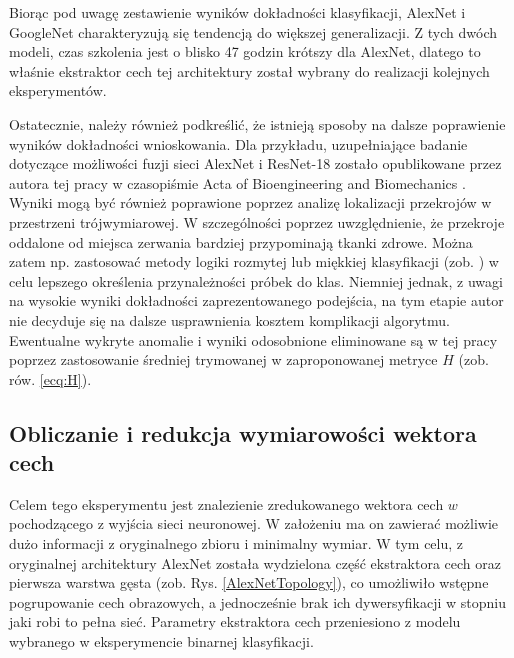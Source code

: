Biorąc pod uwagę zestawienie wyników dokładności klasyfikacji, AlexNet i GoogleNet charakteryzują się tendencją do większej generalizacji. Z tych dwóch modeli, czas szkolenia jest o blisko 47 godzin krótszy dla AlexNet, dlatego to właśnie ekstraktor cech tej architektury został wybrany do realizacji kolejnych eksperymentów. 

Ostatecznie, należy również podkreślić, że istnieją sposoby na dalsze poprawienie wyników dokładności wnioskowania. Dla przykładu, uzupełniające badanie dotyczące możliwości fuzji sieci AlexNet i ResNet-18 zostało opublikowane przez autora tej pracy w czasopiśmie Acta of Bioengineering and Biomechanics \cite{Kapinski19}. Wyniki mogą być również poprawione poprzez analizę lokalizacji przekrojów w przestrzeni trójwymiarowej. W szczególności poprzez uwzględnienie, że przekroje oddalone od miejsca zerwania bardziej przypominają tkanki zdrowe. Można zatem np. zastosować metody logiki rozmytej lub miękkiej klasyfikacji (zob. \cite{Liu2011}) w celu lepszego określenia przynależności próbek do klas. Niemniej jednak, z uwagi na wysokie wyniki dokładności zaprezentowanego podejścia, na tym etapie autor nie decyduje się na dalsze usprawnienia kosztem komplikacji algorytmu. Ewentualne wykryte anomalie i wyniki odosobnione eliminowane są w tej pracy poprzez zastosowanie średniej trymowanej w zaproponowanej metryce $H$ (zob. rów. \ref{ecq:H}).

\subsection{Obliczanie i redukcja wymiarowości wektora cech}

Celem tego eksperymentu jest znalezienie zredukowanego wektora cech $w$ pochodzącego z wyjścia sieci neuronowej. W założeniu ma on zawierać możliwie dużo informacji z oryginalnego zbioru i minimalny wymiar. W tym celu, z oryginalnej architektury AlexNet została wydzielona część ekstraktora cech oraz pierwsza warstwa gęsta (zob. Rys. \ref{AlexNetTopology}), co umożliwiło wstępne pogrupowanie cech obrazowych, a jednocześnie brak ich dywersyfikacji w stopniu jaki robi to pełna sieć. Parametry ekstraktora cech przeniesiono z modelu wybranego w eksperymencie binarnej klasyfikacji. 

